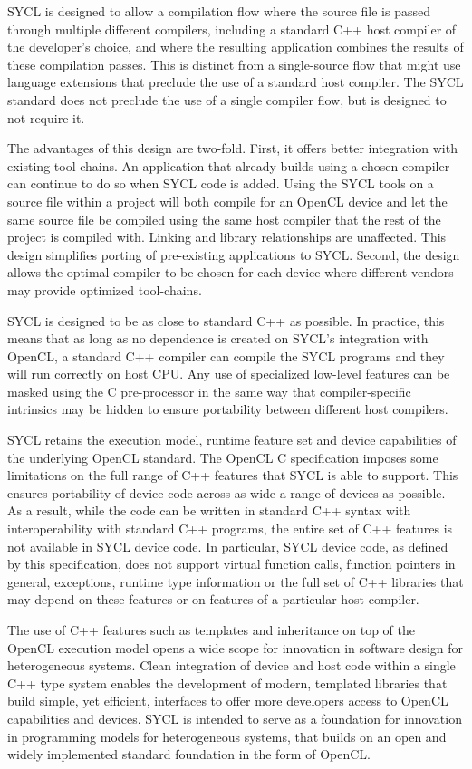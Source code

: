 SYCL is designed to allow a compilation flow where the source file is passed
through multiple different compilers, including a standard C++ host compiler of
the developer's choice, and where the resulting application combines the results
of these compilation passes. This is distinct from a single-source flow that
might use language extensions that preclude the use of a standard host compiler.
The SYCL standard does not preclude the use of a single compiler flow, but is
designed to not require it.

The advantages of this design are two-fold. First, it offers better integration
with existing tool chains. An application that already builds using a chosen
compiler can continue to do so when SYCL code is added. Using the SYCL tools on
a source file within a project will both compile for an OpenCL device and let
the same source file be compiled using the same host compiler that the rest of
the project is compiled with. Linking and library relationships are unaffected.
This design simplifies porting of pre-existing applications to SYCL. Second, the
design allows the optimal compiler to be chosen for each device where different
vendors may provide optimized tool-chains.

SYCL is designed to be as close to standard C++ as possible. In practice, this
means that as long as no dependence is created on SYCL's integration with
OpenCL, a standard C++ compiler can compile the SYCL programs and they will run
correctly on host CPU. Any use of specialized low-level features can be masked
using the C pre-processor in the same way that compiler-specific intrinsics may
be hidden to ensure portability between different host compilers.

SYCL retains the execution model, runtime feature set and device capabilities of
the underlying OpenCL standard. The OpenCL C specification imposes some
limitations on the full range of C++ features that SYCL is able to support. This
ensures portability of device code across as wide a range of devices as
possible. As a result, while the code can be written in standard C++ syntax with
interoperability with standard C++ programs, the entire set of C++ features is
not available in SYCL device code. In particular, SYCL  device code, as defined
by this specification, does not support virtual function calls, function
pointers in general, exceptions, runtime type information or the full set of C++
libraries that may depend on these features or on features of a particular host
compiler.

The use of C++ features such as templates and inheritance on top of the OpenCL
execution model opens a wide scope for innovation in software design for
heterogeneous systems. Clean integration of device and host code within a single
C++ type system enables the development of modern, templated libraries that
build simple, yet efficient, interfaces to offer more developers access to
OpenCL capabilities and devices. SYCL is intended to serve as a foundation for
innovation in programming models for heterogeneous systems, that builds on an
open and widely implemented standard foundation in the form of OpenCL.


